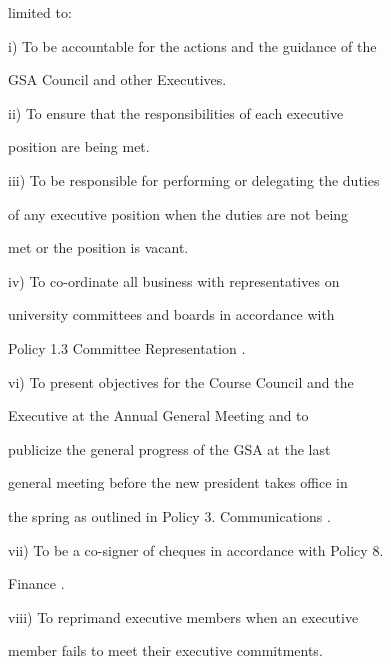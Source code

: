          limited to:   

  

         i)       To be accountable for the actions and the guidance of the  

                  GSA Council and other Executives.  

  

         ii)      To  ensure  that  the  responsibilities  of  each  executive  

                  position are being met.   

  

         iii)     To be responsible for performing or delegating the duties  



                  of any executive position when the duties are not being  



                  met or the position is vacant.   

  

         iv)      To   co-ordinate   all   business   with   representatives   on  



                  university  committees  and  boards  in  accordance  with  



                  Policy 1.3 Committee Representation .   



         vi)      To  present  objectives  for  the  Course  Council  and  the  

                  Executive        at    the    Annual       General       Meeting        and     to  

                  publicize  the  general  progress  of  the  GSA  at  the  last  

                  general meeting before the new president takes office in  

                  the spring as outlined in Policy 3. Communications .   

  

         vii)     To be a co-signer of cheques in accordance with Policy 8.  

                  Finance .   

  

         viii)    To  reprimand  executive  members  when  an  executive  

                  member fails to meet their executive commitments.   


